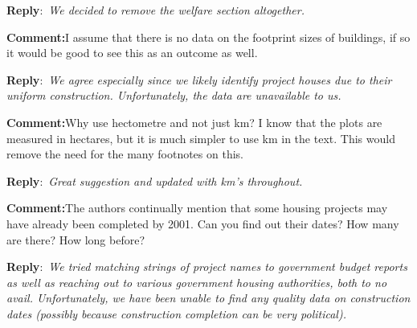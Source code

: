 \documentclass{article}
\newcommand{\reply}{\medskip \noindent \textbf{Reply}:\ \textit }
\newcommand{\sr}{\begin{minipage}{\dimexpr\textwidth-3cm}}
\newcommand{\er}{\end{minipage}}
\newcommand{\cc}{\medskip \noindent \textbf{Comment:}\hspace{2em}}
\begin{document}
\sr
\reply{We decided to remove the welfare section altogether.}\\
\er

\cc I assume that there is no data on the footprint sizes of buildings, if so it would be good to see this as an outcome as well.

\sr
\reply{We agree especially since we likely identify project houses due to their uniform construction.  Unfortunately, the data are unavailable to us.}\\
\er

\cc Why use hectometre and not just km? I know that the plots are measured in hectares, but it is much simpler to use km in the text. This would remove the need for the many footnotes on this.

\sr
\reply{Great suggestion and updated with km's throughout.}\\
\er

\cc The authors continually mention that some housing projects may have already been completed by 2001. Can you find out their dates? How many are there? How long before?

\sr
\reply{We tried matching strings of project names to government budget reports as well as reaching out to various government housing authorities, both to no avail.  Unfortunately, we have been unable to find any quality data on construction dates (possibly because construction completion can be very political).}\\
\er
\end{document}
